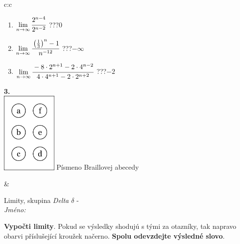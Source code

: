 \documentclass[10pt]{report}
\begin{document}
\begin{tabular}{c:c}
\begin{minipage}[c][104.5mm][t]{0.5\linewidth}
\begin{center}
\begin{minipage}{0.79\linewidth}
\begin{center}
\begin{varwidth}{\linewidth}
\begin{enumerate}
\item $\lim\limits_{n\to\infty}\cfrac{2^{n-4}}{2^{n-2}}$\quad \dotfill\; ???\;\dotfill \quad $0$
\item $\lim\limits_{n\to\infty}\cfrac{\left(\frac{1}{3}\right)^n -1}{n^{-12}}$\quad \dotfill\; ???\;\dotfill \quad $-\infty$
\item $\lim\limits_{n\to\infty}\cfrac{-8\cdot 2^{n+1}-2\cdot 4^{n-2}}{4\cdot 4^{n+1}-2\cdot 2^{n+2}}$\quad \dotfill\; ???\;\dotfill \quad $-2$
\end{enumerate}
\end{varwidth}
\end{center}
\end{minipage}
\begin{minipage}{0.20\linewidth}
\begin{center}
{\Huge\bfseries 3.} \\[2mm]
\includegraphics[height=40mm]{../images/braille.png}
{\small Písmeno Braillovej abecedy}
\end{center}
\end{minipage}
\end{center}
\end{minipage}
&
\begin{minipage}[c][104.5mm][t]{0.5\linewidth}
\begin{center}
\vspace{7mm}
{\huge Limity, skupina \textit{Delta $\delta$} -}\\[5mm]
\textit{Jméno:}\phantom{xxxxxxxxxxxxxxxxxxxxxxxxxxxxxxxxxxxxxxxxxxxxxxxxxxxxxxxxxxxxxxxxx}\\[5mm]
\begin{minipage}{0.95\linewidth}
\begin{center}
\textbf{Vypočti limity}. Pokud se výsledky shodujú s tými za otazníky, tak napravo\\obarvi příslušející kroužek načerno. \textbf{Spolu odevzdejte výsledné slovo}.
\end{center}
\end{minipage}
\\[1mm]
\begin{minipage}{0.79\linewidth}

\end{minipage}
\end{center}
\end{minipage}
\end{tabular}
\end{document}
